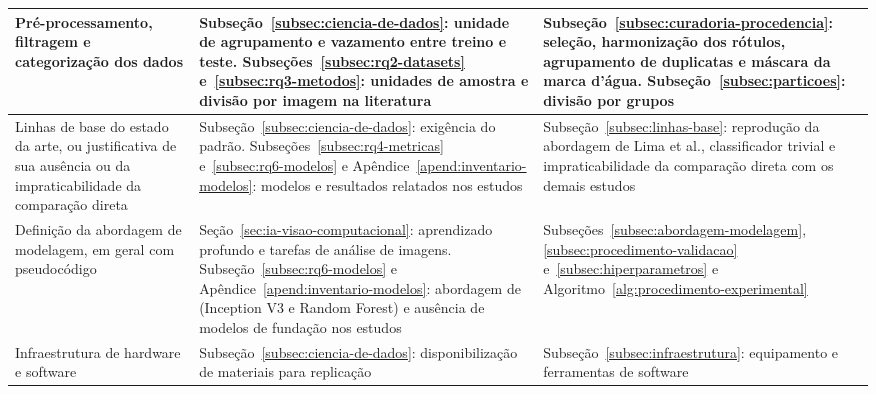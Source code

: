 \begin{longtable}{|>{\raggedright\arraybackslash}p{3.3cm}|>{\raggedright\arraybackslash}p{6.0cm}|>{\raggedright\arraybackslash}p{5.6cm}|}
	Pré-processamento, filtragem e categorização dos dados
	                            & Subseção~\ref{subsec:ciencia-de-dados}: unidade de agrupamento e vazamento entre treino e teste. Subseções~\ref{subsec:rq2-datasets} e~\ref{subsec:rq3-metodos}: unidades de amostra e divisão por imagem na literatura
	                            & Subseção~\ref{subsec:curadoria-procedencia}: seleção, harmonização dos rótulos, agrupamento de duplicatas e máscara da marca d'água. Subseção~\ref{subsec:particoes}: divisão por grupos                                                                                                                                                                             \\ \hline
	Linhas de base do estado da arte, ou justificativa de sua ausência ou da impraticabilidade da comparação direta
	                            & Subseção~\ref{subsec:ciencia-de-dados}: exigência do padrão. Subseções~\ref{subsec:rq4-metricas} e~\ref{subsec:rq6-modelos} e Apêndice~\ref{apend:inventario-modelos}: modelos e resultados relatados nos estudos
	                            & Subseção~\ref{subsec:linhas-base}: reprodução da abordagem de Lima et al., classificador trivial e impraticabilidade da comparação direta com os demais estudos                                                                                                                                                                                                      \\ \hline
	Definição da abordagem de modelagem, em geral com pseudocódigo
	                            & Seção~\ref{sec:ia-visao-computacional}: aprendizado profundo e tarefas de análise de imagens. Subseção~\ref{subsec:rq6-modelos} e Apêndice~\ref{apend:inventario-modelos}: abordagem de \citeonline{lima2024skin} (Inception V3 e Random Forest) e ausência de modelos de fundação nos estudos
	                            & Subseções~\ref{subsec:abordagem-modelagem}, \ref{subsec:procedimento-validacao} e~\ref{subsec:hiperparametros} e Algoritmo~\ref{alg:procedimento-experimental}                                                                                                                                                                                                       \\ \hline
	Infraestrutura de hardware e software
	                            & Subseção~\ref{subsec:ciencia-de-dados}: disponibilização de materiais para replicação
	                            & Subseção~\ref{subsec:infraestrutura}: equipamento e ferramentas de software                                                                                                                                                                                                                                                                                          \\ \hline

\end{longtable}
